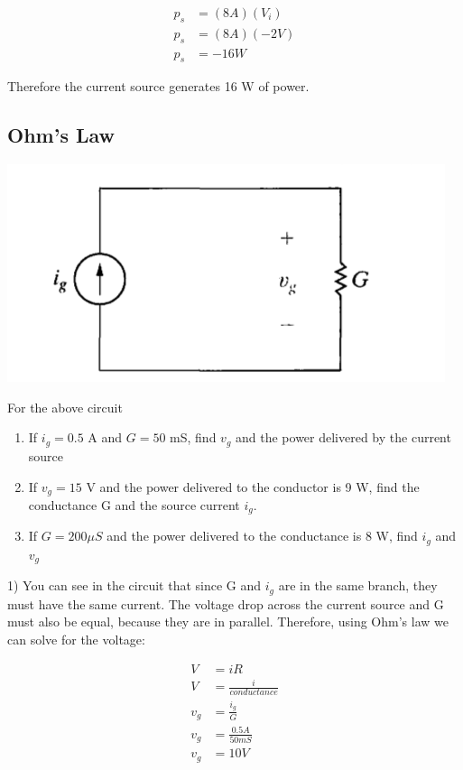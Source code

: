 \begin{align*}
	p_s &= (8 A)(V_i)
	\\ p_s &= (8 A)(-2 V)
	\\ p_s &= -16 W
\end{align*}

Therefore the current source generates 16 W of power. 

\newpage
\subsection{Ohm's Law}
\includegraphics[scale=0.25]{img/c2/p2}

For the above circuit
\begin{enumerate}
	\item If $i_g = 0.5$ A and $G = 50$ mS, find $v_g$ and the power delivered by the current
	source
	\item If $v_g = 15$ V and the power delivered to the conductor is 9 W, find the conductance
	G and the source current $i_g$.
	\item If $G = 200 \mu S$ and the power delivered to the conductance is 8 W, find $i_g$ and 
	$v_g$
\end{enumerate}

1) You can see in the circuit that since G and $i_g$ are in the same branch, they must have
the same current. The voltage drop across the current source and G must also be equal, because
they are in parallel. Therefore, using Ohm's law we can solve for the voltage:

\begin{align*}
	V &= iR \\
	V &= \frac{i}{conductance} \\
	v_{g} &= \frac{i_g}{G} \\
	v_{g} &= \frac{0.5 A}{50mS} \\
	v_{g} &= 10 V
\end{align*}

